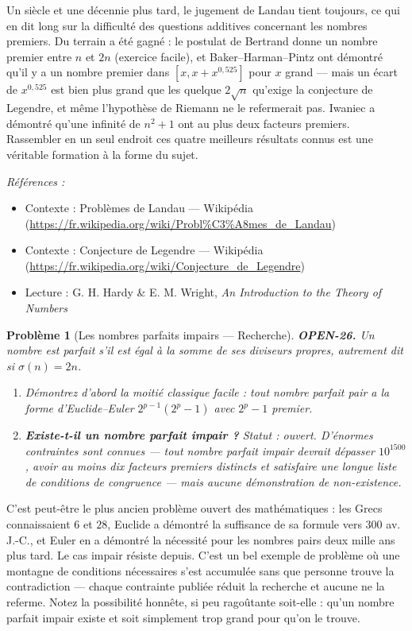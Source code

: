 \documentclass[11pt]{article}
\newtheorem{problem}{Problème}
\newenvironment{refs}{\par\small\noindent\emph{Références :}\begin{itemize}\setlength\itemsep{0pt}}{\end{itemize}\normalsize}
\begin{document}
\noindent Un siècle et une décennie plus tard, le jugement de Landau tient
toujours, ce qui en dit long sur la difficulté des questions additives concernant les
nombres premiers. Du terrain a été gagné : le postulat de Bertrand donne un nombre premier
entre $ n $ et $ 2n $ (exercice facile), et Baker--Harman--Pintz ont démontré qu'il y a
un nombre premier dans $ [x, x + x^{0{,}525}] $ pour $ x $ grand --- mais un écart de
$ x^{0{,}525} $ est bien plus grand que les quelque $ 2\sqrt{n} $ qu'exige la conjecture
de Legendre, et même l'hypothèse de Riemann ne le refermerait pas. Iwaniec a démontré
qu'une infinité de $ n^2+1 $ ont au plus deux facteurs premiers. Rassembler en un seul
endroit ces quatre meilleurs résultats connus est une véritable formation à la forme du
sujet.

\begin{refs}
\item Contexte : Problèmes de Landau --- Wikipédia (\url{https://fr.wikipedia.org/wiki/Probl%C3%A8mes_de_Landau})
\item Contexte : Conjecture de Legendre --- Wikipédia (\url{https://fr.wikipedia.org/wiki/Conjecture_de_Legendre})
\item Lecture : G. H. Hardy \& E. M. Wright, \textit{An Introduction to the Theory of Numbers}
\end{refs}

\bigskip

\begin{problem}[{Les nombres parfaits impairs --- Recherche}]
\textbf{OPEN-26.} Un nombre est \textit{parfait} s'il est égal à la somme de ses diviseurs
propres, autrement dit si $ \sigma(n) = 2n $.
\begin{enumerate}
\item[(a)] Démontrez d'abord la moitié classique facile : tout nombre parfait \textit{pair} a la
forme d'Euclide--Euler $ 2^{p-1}(2^p - 1) $ avec $ 2^p - 1 $ premier.
\item[(b)] \textbf{Existe-t-il un nombre parfait impair ?} Statut : ouvert. D'énormes contraintes
sont connues --- tout nombre parfait impair devrait dépasser $ 10^{1500} $, avoir au moins
dix facteurs premiers distincts et satisfaire une longue liste de conditions de congruence
--- mais aucune démonstration de non-existence.
\end{enumerate}

\end{problem}

\noindent C'est peut-être le plus ancien problème ouvert des mathématiques : les
Grecs connaissaient $ 6 $ et $ 28 $, Euclide a démontré la suffisance de sa formule
vers 300 av. J.-C., et Euler en a démontré la nécessité pour les nombres pairs deux mille
ans plus tard. Le cas impair résiste depuis. C'est un bel exemple de problème où une
montagne de conditions nécessaires s'est accumulée sans que personne trouve la
contradiction --- chaque contrainte publiée réduit la recherche et aucune ne la referme.
Notez la possibilité honnête, si peu ragoûtante soit-elle : qu'un nombre parfait impair
existe et soit simplement trop grand pour qu'on le trouve.
\end{document}
